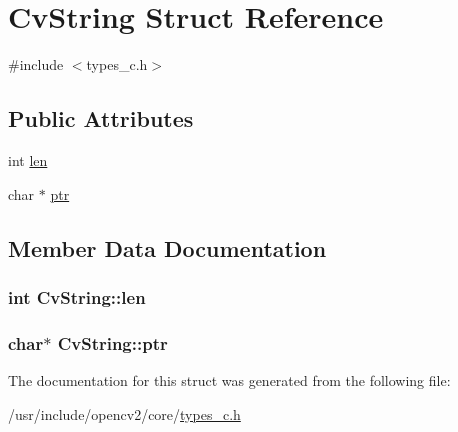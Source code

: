 \hypertarget{structCvString}{\section{Cv\-String Struct Reference}
\label{structCvString}
}


{\ttfamily \#include $<$types\-\_\-c.\-h$>$}

\subsection*{Public Attributes}
\begin{DoxyCompactItemize}
\item 
int \hyperlink{structCvString_afcc9d5d59b2f83e161c8d2819dd90f79}{len}
\item 
char $\ast$ \hyperlink{structCvString_af0a66fd86d633058e964d30fd1359fb4}{ptr}
\end{DoxyCompactItemize}


\subsection{Member Data Documentation}
\hypertarget{structCvString_afcc9d5d59b2f83e161c8d2819dd90f79}{
\subsubsection[{len}]{\setlength{\rightskip}{0pt plus 5cm}int Cv\-String\-::len}}\label{structCvString_afcc9d5d59b2f83e161c8d2819dd90f79}
\hypertarget{structCvString_af0a66fd86d633058e964d30fd1359fb4}{
\subsubsection[{ptr}]{\setlength{\rightskip}{0pt plus 5cm}char$\ast$ Cv\-String\-::ptr}}\label{structCvString_af0a66fd86d633058e964d30fd1359fb4}


The documentation for this struct was generated from the following file\-:\begin{DoxyCompactItemize}
\item 
/usr/include/opencv2/core/\hyperlink{core_2types__c_8h}{types\-\_\-c.\-h}\end{DoxyCompactItemize}
